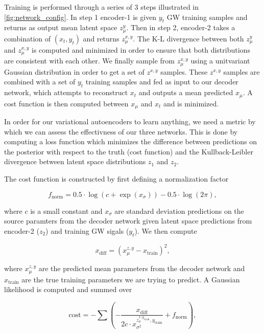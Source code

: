 \documentclass[%
showpacs,
 amsmath,amssymb,
 aps,
 twocolumn,
 prl,
 reprint,
floatfix,
]{revtex4-1}
\begin{document}
%
%
Training is performed through a series of 3 steps illustrated in \ref{fig:network_config}. 
In step 1 encoder-1 is given $y_t$ GW training samples and returns as output mean
latent space $z^{y}_{\mu}$. Then in step 2, encoder-2 takes a combination of $(x_{t},y_{t})$ 
and returns $z^{x,y}_{\mu}$. The K-L divergence between both $z^{y}_{\mu}$ and $z^{x,y}_{\mu}$ is 
computed and minimized in order to ensure that both distributions are consistent with each other. 
We finally sample from $z^{x,y}_{\mu}$ using a unitvariant Gaussian distribution 
in order to get a set of $z^{x,y}$ samples. These $z^{x,y}$ samples are combined with 
a set of $y_t$ training samples and fed as input to our decoder network, which attempts 
to reconstruct $x_t$ and outputs a mean predicted $x_{\mu}$. A cost function is then 
computed between $x_{\mu}$ and $x_t$ and is minimized.

%
%
In order for our variational autoencoders to learn anything, we need a metric by which 
we can assess the effectivness of our three networks. This is done by computing 
a loss function which minimizes the difference 
between predictions on the posterior with respect to the truth (cost function) and the Kullback-Leibler divergence 
between latent space distributions $z_1$ and $z_2$. 

%
%
The cost function is constructed by first defining a normalization factor

\begin{equation}
    f_{\textrm{norm}} = 0.5 \cdot \log(c + \exp(x_{\sigma})) - 0.5 \cdot \log(2\pi),
\end{equation}

where $c$ is a small constant and $x_{\sigma}$ are standard deviation predictions 
on the source paramters from the decoder network given latent space predictions 
from encoder-2 ($z_2$) and training GW sigals ($y_{t}$). We then 
compute 

\begin{equation}
    x_{\textrm{diff}} = (x^{z,y}_{\mu} - x_{\textrm{train}})^{2},
\end{equation}

where $x^{z,y}_{\mu}$ are the predicted mean parameters from the decoder network 
and $x_{\textrm{train}}$ are the true training parameters we are 
trying to predict. A Gaussian likelihood is computed and summed over

\begin{equation}
    \textrm{cost} = - \sum (-\frac{x_{\textrm{diff}}}{2c \cdot 
    x^{z^{x,y_{\textrm{train}}}_{\sigma},y_{\textrm{train}}}_{\sigma^{2}}} + f_{\textrm{norm}}),\label{eq:cost}
\end{equation}
\end{document}
